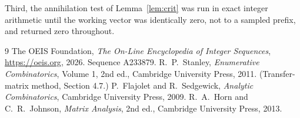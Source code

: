 \documentclass[11pt,a4paper]{article}
\theoremstyle{plain}
\theoremstyle{definition}
\begin{document}
Third, the annihilation test of Lemma~\ref{lem:crit} was run in exact integer arithmetic
until the working vector was identically zero, not to a sampled prefix, and returned zero
throughout.

\begin{thebibliography}{9}
 The OEIS Foundation, \emph{The On-Line Encyclopedia of Integer
Sequences}, \url{https://oeis.org}, 2026. Sequence A233879.
 R.~P.~Stanley, \emph{Enumerative Combinatorics}, Volume 1, 2nd ed.,
Cambridge University Press, 2011. (Transfer-matrix method, Section 4.7.)
 P.~Flajolet and R.~Sedgewick, \emph{Analytic Combinatorics}, Cambridge
University Press, 2009.
 R.~A.~Horn and C.~R.~Johnson, \emph{Matrix Analysis}, 2nd ed., Cambridge
University Press, 2013.
\end{thebibliography}
\end{document}
